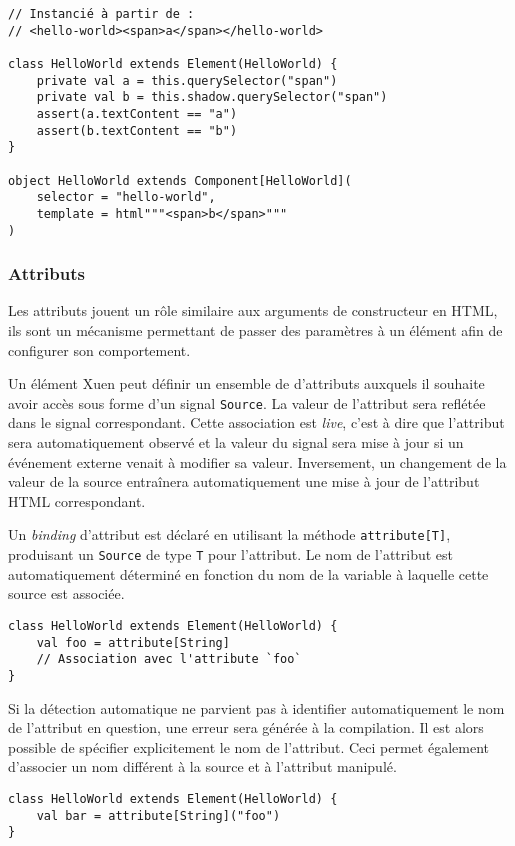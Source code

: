 \begin{lstlisting}
// Instancié à partir de :
// <hello-world><span>a</span></hello-world>

class HelloWorld extends Element(HelloWorld) {
	private val a = this.querySelector("span")
	private val b = this.shadow.querySelector("span")
	assert(a.textContent == "a")
	assert(b.textContent == "b")
}

object HelloWorld extends Component[HelloWorld](
	selector = "hello-world",
	template = html"""<span>b</span>"""
)
\end{lstlisting}

\subsubsection{Attributs}
Les attributs jouent un rôle similaire aux arguments de constructeur en HTML, ils sont un mécanisme permettant de passer des paramètres à un élément afin de configurer son comportement.

Un élément Xuen peut définir un ensemble de d'attributs auxquels il souhaite avoir accès sous forme d'un signal \texttt{Source}. La valeur de l'attribut sera reflétée dans le signal correspondant. Cette association est \emph{live}, c'est à dire que l'attribut sera automatiquement observé et la valeur du signal sera mise à jour si un événement externe venait à modifier sa valeur. Inversement, un changement de la valeur de la source entraînera automatiquement une mise à jour de l'attribut HTML correspondant.

Un \emph{binding} d'attribut est déclaré en utilisant la méthode \texttt{attribute[T]}, produisant un \texttt{Source} de type \texttt{T} pour l'attribut. Le nom de l'attribut est automatiquement déterminé en fonction du nom de la variable à laquelle cette source est associée.

\begin{lstlisting}
class HelloWorld extends Element(HelloWorld) {
	val foo = attribute[String]
	// Association avec l'attribute `foo`
}
\end{lstlisting}

Si la détection automatique ne parvient pas à identifier automatiquement le nom de l'attribut en question, une erreur sera générée à la compilation. Il est alors possible de spécifier explicitement le nom de l'attribut. Ceci permet également d'associer un nom différent à la source et à l'attribut manipulé.

\begin{lstlisting}
class HelloWorld extends Element(HelloWorld) {
	val bar = attribute[String]("foo")
}
\end{lstlisting}

